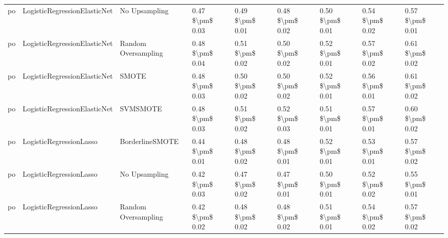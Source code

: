 \begin{tabular}{lllllllll}
      po &    LogisticRegressionElasticNet &                 No Upsampling & 0.47 \$\textbackslash pm\$ 0.03 &           0.49 \$\textbackslash pm\$ 0.01 &       0.48 \$\textbackslash pm\$ 0.02 &        0.50 \$\textbackslash pm\$ 0.01 &                         0.54 \$\textbackslash pm\$ 0.02 &     0.57 \$\textbackslash pm\$ 0.01 \\
      po &    LogisticRegressionElasticNet &           Random Oversampling & 0.48 \$\textbackslash pm\$ 0.04 &           0.51 \$\textbackslash pm\$ 0.02 &       0.50 \$\textbackslash pm\$ 0.02 &        0.52 \$\textbackslash pm\$ 0.01 &                         0.57 \$\textbackslash pm\$ 0.02 &     0.61 \$\textbackslash pm\$ 0.02 \\
      po &    LogisticRegressionElasticNet &                         SMOTE & 0.48 \$\textbackslash pm\$ 0.03 &           0.50 \$\textbackslash pm\$ 0.02 &       0.50 \$\textbackslash pm\$ 0.02 &        0.52 \$\textbackslash pm\$ 0.01 &                         0.56 \$\textbackslash pm\$ 0.01 &     0.61 \$\textbackslash pm\$ 0.02 \\
      po &    LogisticRegressionElasticNet &                      SVMSMOTE & 0.48 \$\textbackslash pm\$ 0.03 &           0.51 \$\textbackslash pm\$ 0.02 &       0.52 \$\textbackslash pm\$ 0.03 &        0.51 \$\textbackslash pm\$ 0.01 &                         0.57 \$\textbackslash pm\$ 0.01 &     0.60 \$\textbackslash pm\$ 0.02 \\
      po &         LogisticRegressionLasso &               BorderlineSMOTE & 0.44 \$\textbackslash pm\$ 0.01 &           0.48 \$\textbackslash pm\$ 0.02 &       0.48 \$\textbackslash pm\$ 0.01 &        0.52 \$\textbackslash pm\$ 0.01 &                         0.53 \$\textbackslash pm\$ 0.01 &     0.57 \$\textbackslash pm\$ 0.02 \\
      po &         LogisticRegressionLasso &                 No Upsampling & 0.42 \$\textbackslash pm\$ 0.03 &           0.47 \$\textbackslash pm\$ 0.02 &       0.47 \$\textbackslash pm\$ 0.01 &        0.50 \$\textbackslash pm\$ 0.01 &                         0.52 \$\textbackslash pm\$ 0.02 &     0.55 \$\textbackslash pm\$ 0.01 \\
      po &         LogisticRegressionLasso &           Random Oversampling & 0.42 \$\textbackslash pm\$ 0.02 &           0.48 \$\textbackslash pm\$ 0.02 &       0.48 \$\textbackslash pm\$ 0.02 &        0.51 \$\textbackslash pm\$ 0.01 &                         0.54 \$\textbackslash pm\$ 0.02 &     0.57 \$\textbackslash pm\$ 0.02 \\

\end{tabular}
